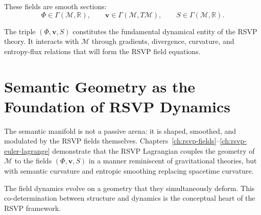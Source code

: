 These fields are smooth sections:
\[
\Phi \in \Gamma(\mathcal{M}, \mathbb{R}),
\qquad
\mathbf{v} \in \Gamma(\mathcal{M}, T\mathcal{M}),
\qquad
S \in \Gamma(\mathcal{M}, \mathbb{R}).
\]

\begin{remark}
The triple $(\Phi, \mathbf{v}, S)$ constitutes the fundamental dynamical entity of the RSVP theory.  
It interacts with $\mathcal{M}$ through gradients, divergence, curvature, and entropy-flux relations that will form the RSVP field equations.
\end{remark}

\section{Semantic Geometry as the Foundation of RSVP Dynamics}

The semantic manifold is not a passive arena: it is shaped, smoothed, and modulated by the RSVP fields themselves.  
Chapters~\ref{ch:rsvp-fields}--\ref{ch:rsvp-euler-lagrange} demonstrate that the RSVP Lagrangian couples the geometry of $\mathcal{M}$ to the fields $(\Phi, \mathbf{v}, S)$ in a manner reminiscent of gravitational theories, but with semantic curvature and entropic smoothing replacing spacetime curvature.

The field dynamics evolve on a geometry that they simultaneously deform.  
This co-determination between structure and dynamics is the conceptual heart of the RSVP framework.
